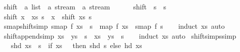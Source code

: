 \begin{isabellebody}
%
\endisadelimproof
%
\isadelimdocument
%
\endisadelimdocument
%
\isatagdocument
%
\isamarkuptrue%
%
\endisatagdocument
{\isafolddocument}%
%
\isadelimdocument
%
\endisadelimdocument
{}\isamarkupfalse%
\ shift\ {\isacharcolon}{\isacharcolon}\ {\isachardoublequoteopen}{\isacharprime}a\ list\ {\isasymRightarrow}\ {\isacharprime}a\ stream\ {\isasymRightarrow}\ {\isacharprime}a\ stream{\isachardoublequoteclose}\ {\isacharparenleft}\ {\isachardoublequoteopen}{\isacharat}{\isacharminus}{\isachardoublequoteclose}\ {}{}{\isacharparenright}\ \isanewline
\ \ {\isachardoublequoteopen}shift\ {\isacharbrackleft}{\isacharbrackright}\ s\ {\isacharequal}\ s{\isachardoublequoteclose}\isanewline
{\isacharbar}\ {\isachardoublequoteopen}shift\ {\isacharparenleft}x\ {\isacharhash}\ xs{\isacharparenright}\ s\ {\isacharequal}\ x\ {\isacharhash}{\isacharhash}\ shift\ xs\ s{\isachardoublequoteclose}\isanewline
\isanewline
{}\isamarkupfalse%
\ smap{\isacharunderscore}shift{\isacharbrackleft}simp{\isacharbrackright}{\isacharcolon}\ {\isachardoublequoteopen}smap\ f\ {\isacharparenleft}xs\ {\isacharat}{\isacharminus}\ s{\isacharparenright}\ {\isacharequal}\ map\ f\ xs\ {\isacharat}{\isacharminus}\ smap\ f\ s{\isachardoublequoteclose}\isanewline
%
\isadelimproof
\ \ %
\endisadelimproof
%
\isatagproof
{}\isamarkupfalse%
\ {\isacharparenleft}induct\ xs{\isacharparenright}\ auto%
\endisatagproof
{\isafoldproof}%
%
\isadelimproof
\isanewline
%
\endisadelimproof
\isanewline
{}\isamarkupfalse%
\ shift{\isacharunderscore}append{\isacharbrackleft}simp{\isacharbrackright}{\isacharcolon}\ {\isachardoublequoteopen}{\isacharparenleft}xs\ {\isacharat}\ ys{\isacharparenright}\ {\isacharat}{\isacharminus}\ s\ {\isacharequal}\ xs\ {\isacharat}{\isacharminus}\ ys\ {\isacharat}{\isacharminus}\ s{\isachardoublequoteclose}\isanewline
%
\isadelimproof
\ \ %
\endisadelimproof
%
\isatagproof
{}\isamarkupfalse%
\ {\isacharparenleft}induct\ xs{\isacharparenright}\ auto%
\endisatagproof
{\isafoldproof}%
%
\isadelimproof
\isanewline
%
\endisadelimproof
\isanewline
{}\isamarkupfalse%
\ shift{\isacharunderscore}simps{\isacharbrackleft}simp{\isacharbrackright}{\isacharcolon}\isanewline
\ \ \ {\isachardoublequoteopen}shd\ {\isacharparenleft}xs\ {\isacharat}{\isacharminus}\ s{\isacharparenright}\ {\isacharequal}\ {\isacharparenleft}if\ xs\ {\isacharequal}\ {\isacharbrackleft}{\isacharbrackright}\ then\ shd\ s\ else\ hd\ xs{\isacharparenright}{\isachardoublequoteclose}\isanewline

\end{isabellebody}
